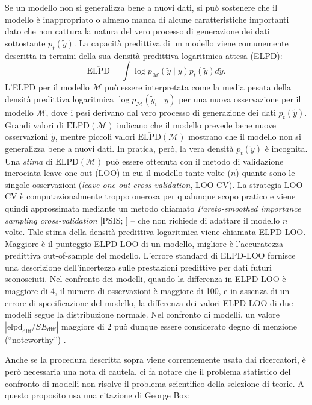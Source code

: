 \documentclass[
  10pt,
  italian,
  a4paper,
  extrafontsizes,onecolumn,openright
  ]{memoir}
\theoremstyle{definition}
\theoremstyle{definition}
\theoremstyle{definition}
\theoremstyle{definition}
\theoremstyle{remark}
\begin{document}
Se un modello non si generalizza bene a nuovi dati, si può sostenere che il modello è inappropriato o almeno manca di alcune caratteristiche importanti dato che non cattura la natura del vero processo di generazione dei dati sottostante \(p_t(\tilde{y})\). La capacità predittiva di un modello viene comunemente descritta in termini della sua densità predittiva logaritmica attesa (ELPD):
\[
\overline{\text{ELPD}} = \int \log p_{\mathcal{M}} (\tilde{y} \mid y) p_t(\tilde{y}) d \tilde{y}.
\]
L'ELPD per il modello \(\mathcal{M}\) può essere interpretata come la media pesata della densità predittiva logaritmica \(\log p_{\mathcal{M}} (\tilde{y}_i \mid y)\) per una nuova osservazione per il modello \(\mathcal{M}\), dove i pesi derivano dal vero processo di generazione dei dati \(p_t(\tilde{y})\). Grandi valori di \(\overline{\text{ELPD}}(\mathcal{M})\) indicano che il modello prevede bene nuove osservazioni \(\tilde{y}\), mentre piccoli valori \(\overline{\text{ELPD}}(\mathcal{M})\) mostrano che il modello non si generalizza bene a nuovi dati. In pratica, però, la vera densità \(p_t(\tilde{y})\) è incognita. Una \emph{stima} di \(\overline{\text{ELPD}}(\mathcal{M})\) può essere ottenuta con il metodo di validazione incrociata leave-one-out (LOO) in cui il modello tante volte (\(n\)) quante sono le singole osservazioni (\emph{leave-one-out cross-validation}, LOO-CV). La strategia LOO-CV è computazionalmente troppo onerosa per qualunque scopo pratico e viene quindi approssimata mediante un metodo chiamato \emph{Pareto-smoothed importance sampling cross-validation} {[}PSIS; \textcite{vehtari2017practical}{]} -- che non richiede di adattare il modello \(n\) volte. Tale stima della densità predittiva logaritmica viene chiamata ELPD-LOO. Maggiore è il punteggio ELPD-LOO di un modello, migliore è l'accuratezza predittiva out-of-sample del modello. L'errore standard di ELPD-LOO fornisce una descrizione dell'incertezza sulle prestazioni predittive per dati futuri sconosciuti. Nel confronto dei modelli, quando la differenza in ELPD-LOO è maggiore di 4, il numero di osservazioni è maggiore di 100, e in assenza di un errore di specificazione del modello, la differenza dei valori ELPD-LOO di due modelli segue la distribuzione normale. Nel confronto di modelli, un valore \(|\text{elpd}_{\text{diff}} / SE_{\text{diff}}|\) maggiore di 2 può dunque essere considerato degno di menzione (``noteworthy'') \autocite{gelman2020regression}.

Anche se la procedura descritta sopra viene correntemente usata dai ricercatori, è però necessaria una nota di cautela. \textcite{navarro2019between} ci fa notare che il problema statistico del confronto di modelli non risolve il problema scientifico della selezione di teorie. A questo proposito usa una citazione di George Box:
\end{document}
